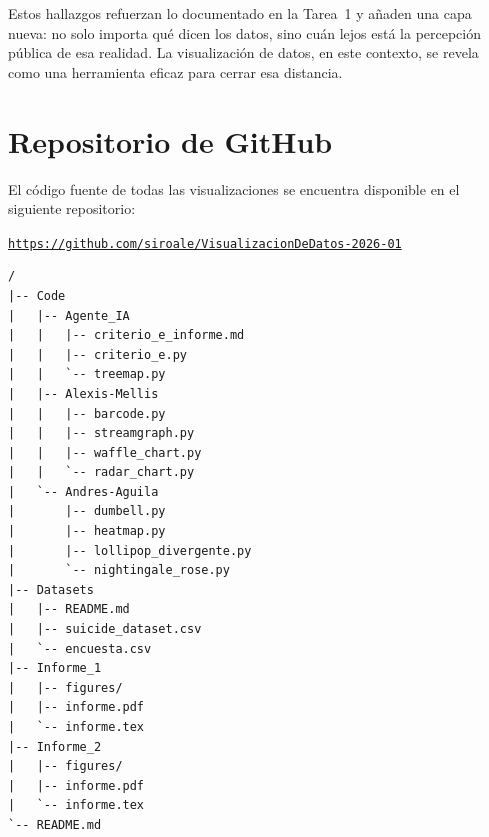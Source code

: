 \documentclass[12pt, letterpaper]{article}
\begin{document}
Estos hallazgos refuerzan lo documentado en la Tarea~1 y añaden una capa nueva: no solo importa qué dicen los datos, sino cuán lejos está la percepción pública de esa realidad. La visualización de datos, en este contexto, se revela como una herramienta eficaz para cerrar esa distancia.

\section{Repositorio de GitHub}

El código fuente de todas las visualizaciones se encuentra disponible en el siguiente repositorio:

\begin{center}
  \href{https://github.com/siroale/VisualizacionDeDatos-2026-01}{\texttt{https://github.com/siroale/VisualizacionDeDatos-2026-01}}
\end{center}

\begin{verbatim}
/
|-- Code
|   |-- Agente_IA
|   |   |-- criterio_e_informe.md
|   |   |-- criterio_e.py
|   |   `-- treemap.py
|   |-- Alexis-Mellis
|   |   |-- barcode.py
|   |   |-- streamgraph.py
|   |   |-- waffle_chart.py
|   |   `-- radar_chart.py
|   `-- Andres-Aguila
|       |-- dumbell.py
|       |-- heatmap.py
|       |-- lollipop_divergente.py
|       `-- nightingale_rose.py
|-- Datasets
|   |-- README.md
|   |-- suicide_dataset.csv
|   `-- encuesta.csv
|-- Informe_1
|   |-- figures/
|   |-- informe.pdf
|   `-- informe.tex
|-- Informe_2
|   |-- figures/
|   |-- informe.pdf
|   `-- informe.tex
`-- README.md
\end{verbatim}

\end{document}
